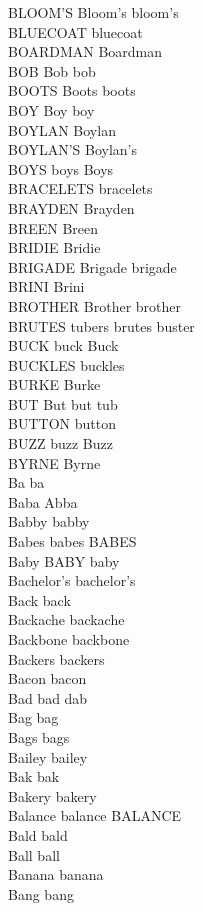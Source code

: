 BLOOM'S Bloom's bloom's\\
BLUECOAT bluecoat\\
BOARDMAN Boardman\\
BOB Bob bob\\
BOOTS Boots boots\\
BOY Boy boy\\
BOYLAN Boylan\\
BOYLAN'S Boylan's\\
BOYS boys Boys\\
BRACELETS bracelets\\
BRAYDEN Brayden\\
BREEN Breen\\
BRIDIE Bridie\\
BRIGADE Brigade brigade\\
BRINI Brini\\
BROTHER Brother brother\\
BRUTES tubers brutes buster\\
BUCK buck Buck\\
BUCKLES buckles\\
BURKE Burke\\
BUT But but tub\\
BUTTON button\\
BUZZ buzz Buzz\\
BYRNE Byrne\\
Ba ba\\
Baba Abba\\
Babby babby\\
Babes babes BABES\\
Baby BABY baby\\
Bachelor's bachelor's\\
Back back\\
Backache backache\\
Backbone backbone\\
Backers backers\\
Bacon bacon\\
Bad bad dab\\
Bag bag\\
Bags bags\\
Bailey bailey\\
Bak bak\\
Bakery bakery\\
Balance balance BALANCE\\
Bald bald\\
Ball ball\\
Banana banana\\
Bang bang\\
